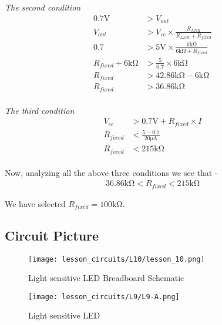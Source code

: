 \emph{The second condition}
\begin{align*}
    0.7\si{\V} & > V_{out} \\
    V_{out} & > V_{cc} \times \frac{R_{LDR}}{R_{LDR} + R_{fixed}} \\
    0.7 & > 5\si{\V} \times \frac{6\si{\kohm}}{6\si{\kohm} + R_{fixed}} \\
    R_{fixed} + 6\si{\kohm} & > \frac{5}{0.7} \times 6\si{\kohm} \\
    R_{fixed} & > 42.86\si{\kohm} - 6\si{\kohm} \\
    R_{fixed} & > 36.86\si{\kohm} \\
\end{align*}

\emph{The third condition}
\begin{align*}
    V_{cc} & > 0.7\si{\V} + R_{fixed} \times I \\
    R_{fixed} & < \frac{5 - 0.7}{20\si{\uA}} \\
    R_{fixed} & < 215\si{\kohm} \\
\end{align*}

Now, analyzing all the above three conditions we see that - 
\begin{align*}
    36.86\si{\kohm} < R_{fixed} < 215\si{\kohm}
\end{align*}

We have selected $R_{fixed} = 100\si{\kohm}$.

\subsection{Circuit Picture}
\begin{figure}[!htp]
    \centering
    \texttt{[image: lesson\_circuits/L10/lesson\_10.png]}
    \caption{Light sensitive LED Breadboard Schematic}
    \label{fig:light_sense_bjt_sch}
\end{figure}
\begin{figure}[!htp]
    \centering
    \texttt{[image: lesson\_circuits/L9/L9-A.png]}
    \caption{Light sensitive LED}
    \label{fig:ldr_bjt_working_obb}
\end{figure}